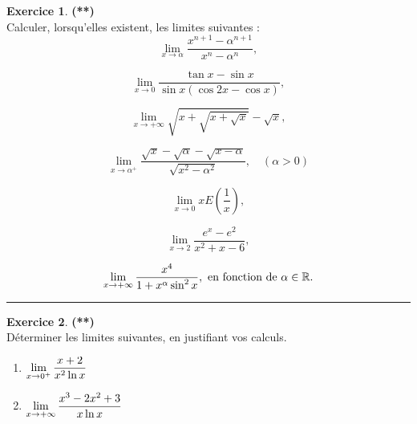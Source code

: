 \documentclass[a4paper,11pt]{article}
\theoremstyle{definition}
\newtheorem{exo}{Exercice} %
\begin{document}
\medskip
\begin{minipage}[t]{1\linewidth}
	\begin{minipage}[t]{0.48\linewidth}
		\raggedright
		
		
		

		
		
		
		\begin{exo}\textbf{(**)}\quad\\[0.2cm]
			Calculer, lorsqu'elles existent, les limites suivantes :
			$$
			\lim_{x\rightarrow \alpha} \frac{x^{n+1}-\alpha^{n+1}}{x^n-\alpha^n},
			$$
			
			$$
			\lim_{x\rightarrow 0} \frac{\tan x - \sin x}{\sin x(\cos 2x - \cos x)},
			$$
			
			$$
			\lim_{x\rightarrow +\infty} \sqrt{x+\sqrt{x+\sqrt{x}}}-\sqrt{x},
			$$
			
			$$
			\lim_{x\rightarrow \alpha^+} \frac{\sqrt{x}-\sqrt{\alpha}-\sqrt{x-\alpha}}{\sqrt{x^2-\alpha^2}}, \quad (\alpha >0)
			$$
			
			$$
			\lim_{x\rightarrow 0} xE\left(\frac{1}{x}\right),
			$$
			
			$$
			\lim_{x\rightarrow 2} \frac{e^x-e^2}{x^2+x-6},
			$$
			
			$$
			\lim_{x\rightarrow +\infty} \frac{x^4}{1+x^\alpha\sin^2x}, \text{ en fonction de $\alpha \in \mathbb{R}$.}
			$$
			
			\centering
			\rule{1\linewidth}{0.6pt}
		\end{exo}
		
		
		\medskip		
		
		
	\end{minipage}	
	\hfill\vrule\hfill
	\begin{minipage}[t]{0.48\linewidth}
		\raggedright
		
		
		\begin{exo}\textbf{(**)}\quad\\[0.2cm]
	 D\'eterminer les limites suivantes, en justifiant vos calculs.
	\begin{enumerate}
		\item $\displaystyle\lim_{x \rightarrow0^+}{x+2 \over x^2 \ln x}$
		
		
		\item $\displaystyle\lim_{x \rightarrow+ \infty}{x^3-2x^2+3 \over x \ln x}$
		
		

\end{enumerate}
\end{exo}
\end{minipage}
\end{minipage}
\end{document}

